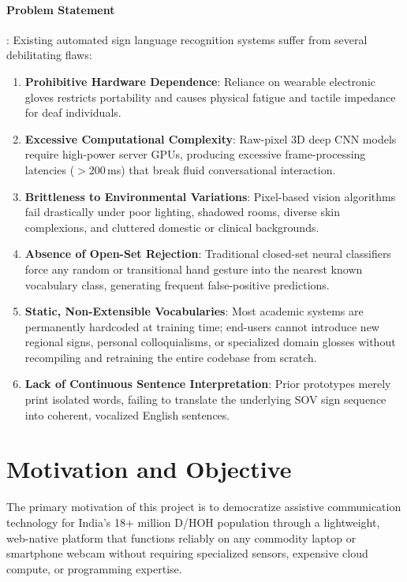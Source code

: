 \paragraph{Problem Statement}:
Existing automated sign language recognition systems suffer from several debilitating flaws:
\begin{enumerate}
    \item \textbf{Prohibitive Hardware Dependence}: Reliance on wearable electronic gloves restricts portability and causes physical fatigue and tactile impedance for deaf individuals.
    \item \textbf{Excessive Computational Complexity}: Raw-pixel 3D deep CNN models require high-power server GPUs, producing excessive frame-processing latencies ($>200$\,ms) that break fluid conversational interaction.
    \item \textbf{Brittleness to Environmental Variations}: Pixel-based vision algorithms fail drastically under poor lighting, shadowed rooms, diverse skin complexions, and cluttered domestic or clinical backgrounds.
    \item \textbf{Absence of Open-Set Rejection}: Traditional closed-set neural classifiers force any random or transitional hand gesture into the nearest known vocabulary class, generating frequent false-positive predictions.
    \item \textbf{Static, Non-Extensible Vocabularies}: Most academic systems are permanently hardcoded at training time; end-users cannot introduce new regional signs, personal colloquialisms, or specialized domain glosses without recompiling and retraining the entire codebase from scratch.
    \item \textbf{Lack of Continuous Sentence Interpretation}: Prior prototypes merely print isolated words, failing to translate the underlying SOV sign sequence into coherent, vocalized English sentences.
\end{enumerate}

\section{Motivation and Objective}

The primary motivation of this project is to democratize assistive communication technology for India's 18+ million D/HOH population through a lightweight, web-native platform that functions reliably on any commodity laptop or smartphone webcam without requiring specialized sensors, expensive cloud compute, or programming expertise.

